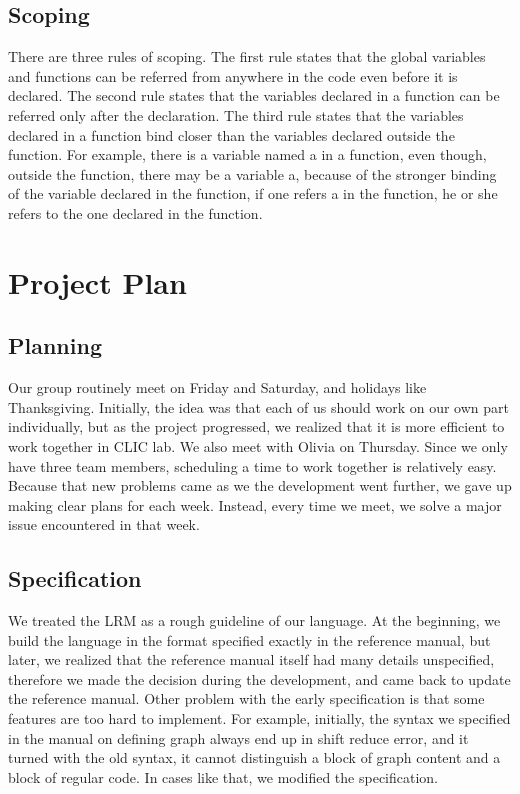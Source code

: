 \documentclass[a4paper,12pt]{article}
\begin{document}
\subsection{Scoping}
There are three rules of scoping. The first rule states that the global variables and functions can be referred from anywhere in the code even before it is declared. The second rule states that the variables declared in a function can be referred only after the declaration. The third rule states that the variables declared in a function bind closer than the variables declared outside the function. For example, there is a variable named a in a function, even though, outside the function, there may be a variable a, because of the stronger binding of the variable declared in the function, if one refers a in the function, he or she refers to the one declared in the function.

\section{Project Plan}
\subsection{Planning}
Our group routinely meet on Friday and Saturday, and holidays like Thanksgiving. Initially, the idea was that each of us should work on our own part individually, but as the project progressed, we realized that it is more efficient to work together in CLIC lab. We also meet with Olivia on Thursday. Since we only have three team members, scheduling a time to work together is relatively easy. Because that new problems came as we the development went further, we gave up making clear plans for each week. Instead, every time we meet, we solve a major issue encountered in that week.

\subsection{Specification}
We treated the LRM as a rough guideline of our language. At the beginning, we build the language in the format specified exactly in the reference manual, but later, we realized that the reference manual itself had many details unspecified, therefore we made the decision during the development, and came back to update the reference manual. Other problem with the early specification is that some features are too hard to implement. For example, initially, the syntax we specified in the manual on defining graph always end up in shift reduce error, and it turned with the old syntax, it cannot distinguish a block of graph content and a block of regular code. In cases like that, we modified the specification.
\end{document}
